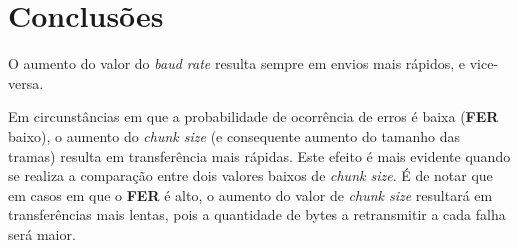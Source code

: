 \documentclass[11pt]{report}
\begin{document}
\chapter{Conclusões}

O aumento do valor do \textit{baud rate} resulta sempre em envios mais rápidos,
e vice-versa.

Em circunstâncias em que a probabilidade de ocorrência de erros é baixa
(\textbf{FER} baixo), o aumento do \textit{chunk size} (e consequente aumento
do tamanho das tramas) resulta em transferência mais rápidas. Este efeito é
mais evidente quando se realiza a comparação entre dois valores baixos de
\textit{chunk size}. É de notar que em casos em que o \textbf{FER} é alto,
o aumento do valor de \textit{chunk size} resultará em transferências mais
lentas, pois a quantidade de bytes a retransmitir a cada falha será maior.
\end{document}
